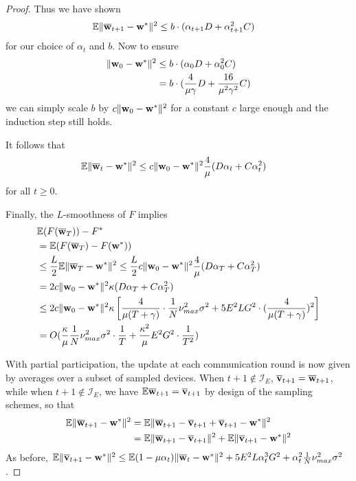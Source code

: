 \begin{proof}
	Thus we have shown 
	\begin{align*}
	\mathbb{E}\|{\overline{\mathbf{w}}}_{t+1}-{\mathbf{w}}^{\ast}\|^{2} & \leq b\cdot(\alpha_{t+1}D+\alpha_{t+1}^{2}C)
	\end{align*}
	for our choice of $\alpha_{t}$ and $b$. Now to ensure 
	\begin{align*}
	\|{\mathbf{w}}_{0}-{\mathbf{w}}^{\ast}\|^{2} & \leq b\cdot(\alpha_{0}D+\alpha_{0}^{2}C)\\
	& =b\cdot(\frac{4}{\mu\gamma}D+\frac{16}{\mu^{2}\gamma^{2}}C)
	\end{align*}
	we can simply scale $b$ by $c\|{\mathbf{w}}_{0}-{\mathbf{w}}^{\ast}\|^{2}$ for a constant
	$c$ large enough and the induction step still holds. 
	
	It follows that 
	\begin{align*}
	\mathbb{E}\|{\overline{\mathbf{w}}}_{t}-{\mathbf{w}}^{\ast}\|^{2} & \leq c\|{\mathbf{w}}_{0}-{\mathbf{w}}^{\ast}\|^{2}\frac{4}{\mu}(D\alpha_{t}+C\alpha_{t}^{2})
	\end{align*}
	for all $t\geq0$. 
	
	Finally, the $L$-smoothness of $F$ implies 
	\begin{align*}
	& \mathbb{E}(F({\overline{\mathbf{w}}}_{T}))-F^{\ast}\\
	& =\mathbb{E}(F({\overline{\mathbf{w}}}_{T})-F({\mathbf{w}}^{\ast}))\\
	& \leq\frac{L}{2}\mathbb{E}\|{\overline{\mathbf{w}}}_{T}-{\mathbf{w}}^{\ast}\|^{2}\leq\frac{L}{2}c\|{\mathbf{w}}_{0}-{\mathbf{w}}^{\ast}\|^{2}\frac{4}{\mu}(D\alpha_{T}+C\alpha_{T}^{2})\\
	& =2c\|{\mathbf{w}}_{0}-{\mathbf{w}}^{\ast}\|^{2}\kappa(D\alpha_{T}+C\alpha_{T}^{2})\\
	& \leq2c\|{\mathbf{w}}_{0}-{\mathbf{w}}^{\ast}\|^{2}\kappa\left[\frac{4}{\mu(T+\gamma)}\cdot\frac{1}{N}\nu_{max}^{2}\sigma^{2}+5E^{2}LG^{2}\cdot(\frac{4}{\mu(T+\gamma)})^{2}\right]\\
	& =O(\frac{\kappa}{\mu}\frac{1}{N}\nu_{max}^{2}\sigma^{2}\cdot\frac{1}{T}+\frac{\kappa^{2}}{\mu}E^{2}G^{2}\cdot\frac{1}{T^{2}})
	\end{align*}
	
	With partial participation, the update at each communication round
	is now given by averages over a subset of sampled devices. When $t+1\notin\mathcal{I}_{E}$,
	${\overline{\mathbf{v}}}_{t+1}={\overline{\mathbf{w}}}_{t+1}$, while when $t+1\notin\mathcal{I}_{E}$,
	we have $\mathbb{E}{\overline{\mathbf{w}}}_{t+1}={\overline{\mathbf{v}}}_{t+1}$ by design
	of the sampling schemes, so that 
	\begin{align*}
	\mathbb{E}\|{\overline{\mathbf{w}}}_{t+1}-{\mathbf{w}}^{\ast}\|^{2} & =\mathbb{E}\|{\overline{\mathbf{w}}}_{t+1}-{\overline{\mathbf{v}}}_{t+1}+{\overline{\mathbf{v}}}_{t+1}-{\mathbf{w}}^{\ast}\|^{2}\\
	& =\mathbb{E}\|{\overline{\mathbf{w}}}_{t+1}-{\overline{\mathbf{v}}}_{t+1}\|^{2}+\mathbb{E}\|{\overline{\mathbf{v}}}_{t+1}-{\mathbf{w}}^{\ast}\|^{2}
	\end{align*}
	As before, $\mathbb{E}\|{\overline{\mathbf{v}}}_{t+1}-{\mathbf{w}}^{\ast}\|^{2}\leq\mathbb{E}(1-\mu\alpha_{t})\|{\overline{\mathbf{w}}}_{t}-{\mathbf{w}}^{\ast}\|^{2}+5E^{2}L\alpha_{t}^{3}G^{2}+\alpha_{t}^{2}\frac{1}{N}\nu_{max}^{2}\sigma^{2}$. 
	

\end{proof}
